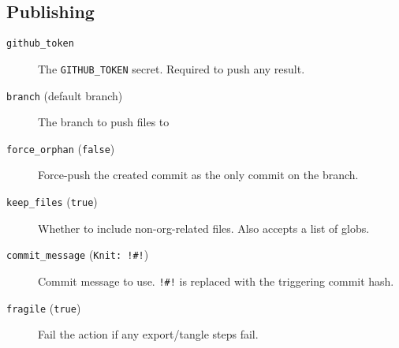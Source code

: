 \documentclass[11pt]{article}
\begin{document}
\subsection{Publishing}
\label{sec:orge7f1a35}
\begin{description}
\item[{\texttt{github\_token}}] The \texttt{GITHUB\_TOKEN} secret. Required to push any result.
\item[{\texttt{branch} (default branch)}] The branch to push files to
\item[{\texttt{force\_orphan} (\texttt{false})}] Force-push the created commit as the only commit on
the branch.
\item[{\texttt{keep\_files} (\texttt{true})}] Whether to include non-org-related files. Also accepts a
list of globs.
\item[{\texttt{commit\_message} (\texttt{Knit: !\#!})}] Commit message to use. \texttt{!\#!} is replaced with the
triggering commit hash.
\item[{\texttt{fragile} (\texttt{true})}] Fail the action if any export/tangle steps fail.
\end{description}
\end{document}
